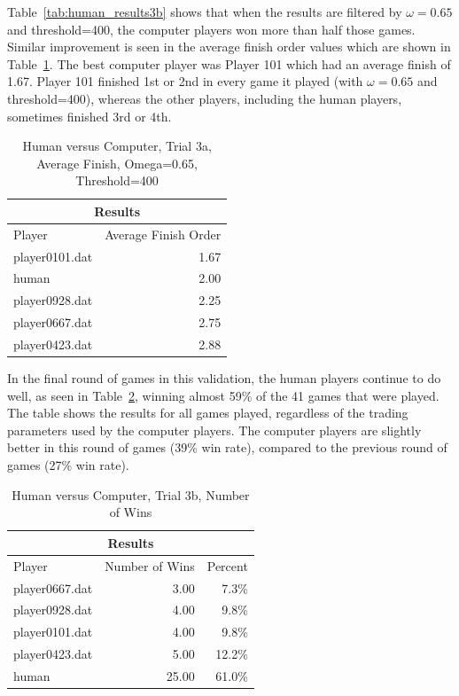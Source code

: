 Table~\ref{tab:human_results3b} shows that when the results are filtered by
\(\omega=0.65\) and threshold=400, the computer players won more than half those
games. Similar improvement is seen in the average finish order values which are
shown in Table~\ref{tab:human_results3c}. The best computer player was Player
101 which had an average finish of 1.67. Player 101 finished 1st or 2nd in every
game it played (with \(\omega=0.65\) and threshold=400), whereas the other
players, including the human players, sometimes finished 3rd or 4th.

\begin{table}[htbp]
  \centering \caption[Human versus Computer, Trial 3a, Average Finish]{Human
  versus Computer, Trial 3a, Average Finish, Omega=0.65, Threshold=400}
    \begin{tabular}{lr}
    \toprule
    \multicolumn{2}{c}{Results}  \\
    \midrule
    Player & Average Finish Order \\
    \multicolumn{1}{l}{player0101.dat} & 1.67 \\
    \multicolumn{1}{l}{human} & 2.00 \\
    \multicolumn{1}{l}{player0928.dat} & 2.25 \\
    \multicolumn{1}{l}{player0667.dat} & 2.75 \\
    \multicolumn{1}{l}{player0423.dat} & 2.88 \\
    \bottomrule
    \end{tabular}%
  \label{tab:human_results3c}%
\end{table}%

In the final round of games in this validation, the human players continue to
do well, as seen in Table~\ref{tab:human_results3d}, winning almost 59\% of the
41 games that were played. The table shows the results for all games played,
regardless of the trading parameters used by the computer players. The computer
players are slightly better in this round of games (39\% win rate), compared to
the previous round of games (27\% win rate).

\begin{table}[htbp]
  \centering
  \caption{Human versus Computer, Trial 3b, Number of Wins}
    \begin{tabular}{lrr}
    \toprule
    \multicolumn{3}{c}{Results}  \\
    \midrule
    Player & Number of Wins & Percent \\
    \multicolumn{1}{l}{player0667.dat} & 3.00   & 7.3\% \\
    \multicolumn{1}{l}{player0928.dat} & 4.00   & 9.8\% \\
    \multicolumn{1}{l}{player0101.dat} & 4.00   & 9.8\% \\
    \multicolumn{1}{l}{player0423.dat} & 5.00   & 12.2\% \\
    \multicolumn{1}{l}{human} & 25.00  & 61.0\% \\
    \bottomrule
    \end{tabular}%
  \label{tab:human_results3d}%
\end{table}%

